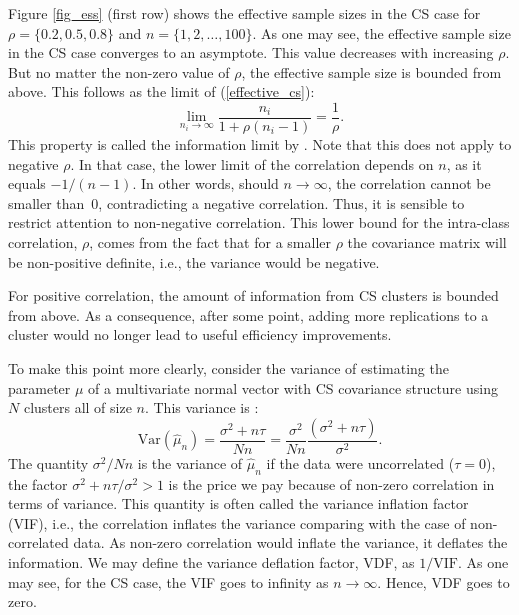 \documentclass[11pt,a5paper,twoside]{book}
\begin{document}
Figure \ref{fig_ess} (first row) shows the effective sample sizes in the CS case for $\rho=\{0.2,0.5,0.8\}$ and $n=\{1,2,\ldots,100\}$. As one may see, the effective sample size in the CS case converges to an asymptote. This value decreases with increasing $\rho$. But no matter the non-zero value of $\rho$, the effective sample size is bounded from above. This follows as the limit of (\ref{effective_cs}):  
\begin{equation}
\label{information_limit}
\lim_{n_i\rightarrow \infty} \frac{n_i}{1+\rho (n_i-1)} = \frac{1}{\rho}.
\end{equation}
This property is called the information limit by \cite{faes2009}.
 Note that this does not apply to negative $\rho$. In that case, the lower limit of the correlation depends on $n$, as it equals $-1/(n-1)$. In other words, should $n\rightarrow\infty$, the correlation cannot be smaller than~$0$, contradicting a negative correlation. Thus, it is sensible to restrict attention to non-negative correlation. This lower bound for the intra-class correlation, $\rho$, comes from the fact that for a smaller $\rho$ the covariance matrix will be non-positive definite, i.e., the variance would be negative.

For positive correlation, the amount of information from  CS clusters is bounded from above. As a consequence, after some point, adding more replications to a cluster would no longer lead to useful efficiency improvements.

To make this point more clearly, consider the variance of estimating the parameter $\mu$ of a multivariate normal vector with CS covariance structure using $N$ clusters all of size $n$. This variance is \cite{Iddi2011}:
\begin{equation}
\label{var_mu_cs}
\mathrm{Var}(\widehat{\mu}_{n})= \frac{\sigma^2 + n \tau}{N n}= \frac{\sigma^2}{Nn} \frac{\left(\sigma^2+ n\tau\right)}{\sigma^2}.
\end{equation}
The quantity $\sigma^2/Nn$ is the variance of $\widehat{\mu}_{n}$ if the data were uncorrelated ($\tau=0$), the factor $\sigma^2 + n\tau / \sigma^2 >1$ is the price we pay because of non-zero correlation in terms of variance. This quantity is often called the variance inflation factor (VIF), i.e., the correlation inflates the variance comparing with the case of non-correlated data. As non-zero correlation would inflate the variance, it deflates the information. We may define the variance deflation factor, VDF, as $1/\mathrm{VIF}$. As one may see, for the CS case, the VIF goes to infinity as $n\rightarrow\infty$. Hence, VDF goes to zero.
\end{document}
